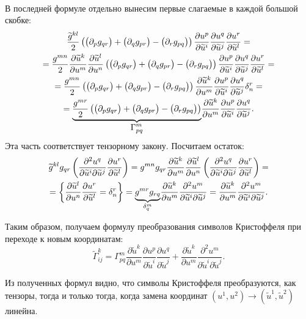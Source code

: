 \begin{solution}
\begin{gather*}
	\end{gather*}
	В последней формуле отдельно вынесим первые слагаемые в каждой большой скобке:
	\begin{multline*}
		\frac{\widetilde{g}^{kl}}{2}\left(\big(\partial_pg_{qr}\big) + \big(\partial_qg_{pr}\big) - \big(\partial_rg_{pq}\big)\right)\frac{\partial u^p}{\partial \widetilde{u}^i}\frac{\partial u^q}{\partial \widetilde{u}^j}\frac{\partial u^r}{\partial \widetilde{u}^l} =\\ = \frac{g^{mn}}{2}\frac{\partial\widetilde{u}^k}{\partial u^m}\frac{\partial\widetilde{u}^l}{\partial u^n}\left(\big(\partial_pg_{qr}\big) + \big(\partial_qg_{pr}\big) - \big(\partial_rg_{pq}\big)\right)\frac{\partial u^p}{\partial \widetilde{u}^i}\frac{\partial u^q}{\partial \widetilde{u}^j}\frac{\partial u^r}{\partial \widetilde{u}^l} =\\ = \frac{g^{mn}}{2}\left(\big(\partial_pg_{qr}\big) + \big(\partial_qg_{pr}\big) - \big(\partial_rg_{pq}\big)\right)\frac{\partial \widetilde{u}^k}{\partial u^m}\frac{\partial u^p}{\partial \widetilde{u}^i}\frac{\partial u^q}{\partial \widetilde{u}^j}\delta_n^r =\\ = {\underbrace{\frac{g^{mr}}{2}\left(\big(\partial_pg_{qr}\big) + \big(\partial_qg_{pr}\big) - \big(\partial_rg_{pq}\big)\right)}_{\displaystyle\Gamma_{pq}^m}}\frac{\partial \widetilde{u}^k}{\partial u^m}\frac{\partial u^p}{\partial \widetilde{u}^i}\frac{\partial u^q}{\partial \widetilde{u}^j}.
	\end{multline*}
	Эта часть соответствует тензорному закону. Посчитаем остаток:
	\begin{multline*}
		\widetilde{g}^{kl}g_{qr}\left(\frac{\partial^2u^q}{\partial\widetilde{u}^i\partial\widetilde{u}^j}\frac{\partial u^r}{\partial\widetilde{u}^l}\right) = g^{mn}g_{qr}\frac{\partial\widetilde{u}^k}{\partial u^m}\frac{\partial\widetilde{u}^l}{\partial u^n}\left(\frac{\partial^2u^q}{\partial\widetilde{u}^i\partial\widetilde{u}^j}\frac{\partial u^r}{\partial\widetilde{u}^l}\right) = \\ = \left\{\frac{\partial \widetilde{u}^l}{\partial u^n}\frac{\partial u^r}{\partial \widetilde{u}^l} = \delta^r_n\right\} = {\underbrace{g^{mr}g_{rq}}_{\delta^m_q}}\frac{\partial\widetilde{u}^k}{\partial u^m}\frac{\partial^2u^m}{\partial\widetilde{u}^i\partial\widetilde{u}^j} = \frac{\partial\widetilde{u}^k}{\partial u^m}\frac{\partial^2u^m}{\partial\widetilde{u}^i\partial\widetilde{u}^j}.
	\end{multline*}

	Таким образом, получаем формулу преобразования символов Кристоффеля при переходе к новым координатам:
	\[
		\widetilde{\Gamma}_{ij}^k = \Gamma_{pq}^m\frac{\partial \widetilde{u}^k}{\partial u^m}\frac{\partial u^p}{\partial \widetilde{u}^i}\frac{\partial u^q}{\partial \widetilde{u}^j} + \frac{\partial\widetilde{u}^k}{\partial u^m}\frac{\partial^2u^m}{\partial\widetilde{u}^i\partial\widetilde{u}^j}.
	\]

	Из полученных формул видно, что символы Кристоффеля преобразуются, как тензоры, тогда и только тогда, когда замена координат $(u^1, u^2) \to (\widetilde{u}^1, \widetilde{u}^2)$ линейна.
\end{solution}

